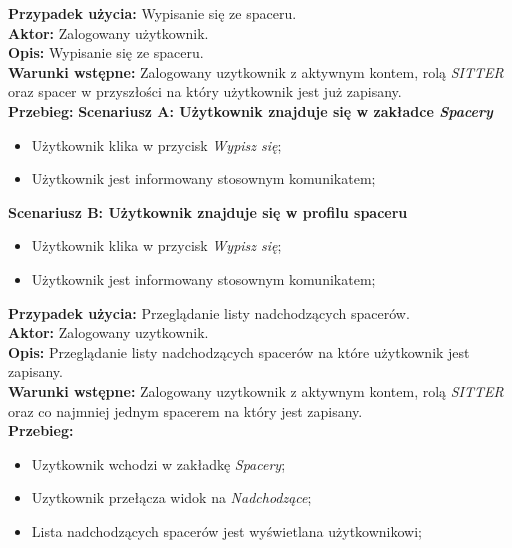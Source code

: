 \noindent
\textbf{Przypadek użycia:} Wypisanie się ze spaceru. \\
\textbf{Aktor:} Zalogowany użytkownik. \\
\textbf{Opis:} Wypisanie się ze spaceru. \\
\textbf{Warunki wstępne:} Zalogowany uzytkownik z aktywnym kontem, rolą \textit{SITTER} oraz spacer w przyszłości na który użytkownik jest już zapisany. \\
\textbf{Przebieg:}
\textbf{Scenariusz A: Użytkownik znajduje się w zakładce \textit{Spacery}}
\begin{itemize}
    \item Użytkownik klika w przycisk \textit{Wypisz się};
    \item Użytkownik jest informowany stosownym komunikatem;
\end{itemize}
\textbf{Scenariusz B: Użytkownik znajduje się w profilu spaceru}
\begin{itemize}
    \item Użytkownik klika w przycisk \textit{Wypisz się};
    \item Użytkownik jest informowany stosownym komunikatem;
\end{itemize}

\noindent
\textbf{Przypadek użycia:} Przeglądanie listy nadchodzących spacerów. \\
\textbf{Aktor:} Zalogowany uzytkownik. \\
\textbf{Opis:} Przeglądanie listy nadchodzących spacerów na które użytkownik jest zapisany. \\
\textbf{Warunki wstępne:} Zalogowany uzytkownik z aktywnym kontem, rolą \textit{SITTER} oraz co najmniej jednym spacerem na który jest zapisany. \\
\textbf{Przebieg:}
\begin{itemize}
    \item Uzytkownik wchodzi w zakładkę \textit{Spacery};
    \item Uzytkownik przełącza widok na \textit{Nadchodzące};
    \item Lista nadchodzących spacerów jest wyświetlana użytkownikowi;
\end{itemize}

